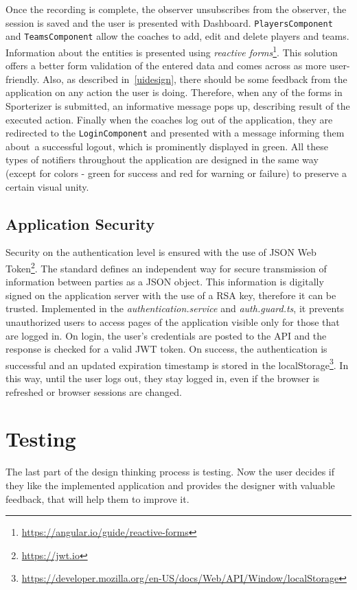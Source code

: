 Once the recording is complete, the observer unsubscribes from the observer, the session is saved and the user is presented with Dashboard. \texttt{PlayersComponent} and \texttt{TeamsComponent} allow the coaches to add, edit and delete players and teams. Information about the entities is presented using \textit{reactive forms}\footnote{\url{https://angular.io/guide/reactive-forms}}. This solution offers a better form validation of the entered data and comes across as more user-friendly. Also, as described in~\ref{uidesign}, there should be some feedback from the application on any action the user is doing. Therefore, when any of the forms in Sporterizer is submitted, an informative message pops up, describing result of the executed action. Finally when the coaches log out of the application, they are redirected to the \texttt{LoginComponent} and presented with a message informing them about~a successful logout, which is prominently displayed in green. All these types of notifiers throughout the application are designed in the same way (except for colors - green for success and red for warning or failure) to preserve a certain visual unity.

\subsection{Application Security}
Security on the authentication level is ensured with the use of JSON Web Token\footnote{\url{https://jwt.io}}. The standard defines an independent way for secure transmission of information between parties as a JSON object. This information is digitally signed on the application server with the use of a RSA key, therefore it can be trusted. Implemented in the \textit{authentication.service} and \textit{auth.guard.ts}, it prevents unauthorized users to access pages of the application visible only for those that are logged in. On login, the user’s credentials are posted to the API and the response is checked for a valid JWT token. On success, the authentication is successful and an updated expiration timestamp is stored in the localStorage\footnote{\url{https://developer.mozilla.org/en-US/docs/Web/API/Window/localStorage}}. In this way, until the user logs out, they stay logged in, even if the browser is refreshed or browser sessions are changed.

\section{Testing}
The last part of the design thinking process is testing. Now the user decides if they like the implemented application and provides the designer with valuable feedback, that will help them to improve it.

